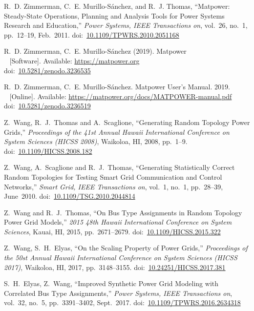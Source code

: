 \documentclass[12pt]{article}
\newcommand{\matpower}[0]{{\sc Matpower}}
\newcommand{\doi}[1]{doi:~\href{https://doi.org/#1}{#1}}
\numberwithin{equation}{section}
\numberwithin{table}{section}
\numberwithin{figure}{section}
\begin{document}
\clearpage
\begin{thebibliography}{99}

R.~D. Zimmerman, C.~E. Murillo-S{\'a}nchez, and R.~J. Thomas, ``\matpower{}: Steady-State Operations, Planning and Analysis Tools for Power Systems Research and Education,'' \emph{Power Systems, IEEE Transactions on}, vol.~26, no.~1, pp.~12--19, Feb.~2011. \doi{10.1109/TPWRS.2010.2051168}

R.~D. Zimmerman, C.~E. Murillo-S{\'a}nchez (2019). \matpower{}\\~
[Software]. Available: \url{https://matpower.org}\\
\doi{10.5281/zenodo.3236535}

R.~D. Zimmerman, C.~E. Murillo-S{\'a}nchez. \matpower{} User's Manual. 2019.\\~
[Online]. Available: \url{https://matpower.org/docs/MATPOWER-manual.pdf}\\
\doi{10.5281/zenodo.3236519}

Z.~Wang, R.~J.~Thomas and A.~Scaglione, ``Generating Random Topology Power Grids,'' \emph{Proceedings of the 41st Annual Hawaii International Conference on System Sciences (HICSS 2008)}, Waikoloa, HI, 2008, pp.~1--9.
\doi{10.1109/HICSS.2008.182}

Z.~Wang, A.~Scaglione and R.~J.~Thomas, ``Generating Statistically Correct Random Topologies for Testing Smart Grid Communication and Control Networks,'' \emph{Smart Grid, IEEE Transactions on}, vol.~1, no.~1, pp.~28--39, June~2010.
\doi{10.1109/TSG.2010.2044814}

Z.~Wang and R.~J.~Thomas, ``On Bus Type Assignments in Random Topology Power Grid Models,'' \emph{2015 48th Hawaii International Conference on System Sciences}, Kauai, HI, 2015, pp.~2671--2679.
\doi{10.1109/HICSS.2015.322}

Z.~Wang, S.~H.~Elyas, ``On the Scaling Property of Power Grids,'' \emph{Proceedings of the 50st Annual Hawaii International Conference on System Sciences (HICSS 2017)}, Waikoloa, HI, 2017, pp.~3148--3155.
\doi{10.24251/HICSS.2017.381}

S.~H.~Elyas, Z.~Wang, ``Improved Synthetic Power Grid Modeling with Correlated Bus Type Assignments,'' \emph{Power Systems, IEEE Transactions on}, vol.~32, no.~5, pp.~3391--3402, Sept.~2017.
\doi{10.1109/TPWRS.2016.2634318}


\end{thebibliography}
\end{document}
